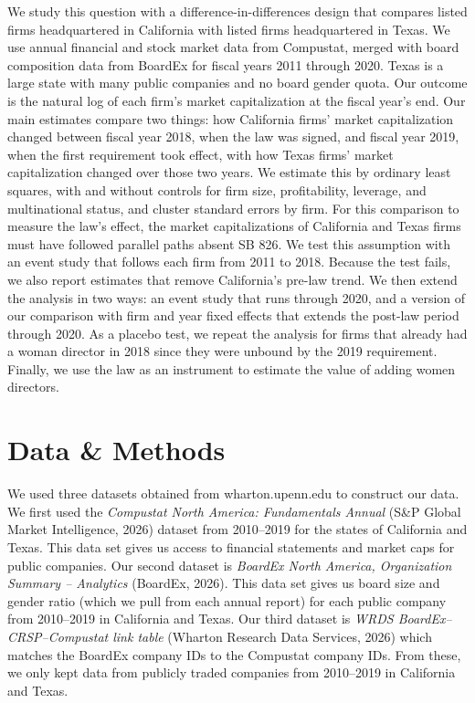 \documentclass[12pt]{article}
\begin{document}
We study this question with a difference-in-differences design that compares listed firms headquartered in California with listed firms headquartered in Texas. We use annual financial and stock market data from Compustat, merged with board composition data from BoardEx for fiscal years 2011 through 2020. Texas is a large state with many public companies and no board gender quota. Our outcome is the natural log of each firm's market capitalization at the fiscal year's end. Our main estimates compare two things: how California firms' market capitalization changed between fiscal year 2018, when the law was signed, and fiscal year 2019, when the first requirement took effect, with how Texas firms' market capitalization changed over those two years. We estimate this by ordinary least squares, with and without controls for firm size, profitability, leverage, and multinational status, and cluster standard errors by firm. For this comparison to measure the law's effect, the market capitalizations of California and Texas firms must have followed parallel paths absent SB 826. We test this assumption with an event study that follows each firm from 2011 to 2018. Because the test fails, we also report estimates that remove California's pre-law trend. We then extend the analysis in two ways: an event study that runs through 2020, and a version of our comparison with firm and year fixed effects that extends the post-law period through 2020. As a placebo test, we repeat the analysis for firms that already had a woman director in 2018 since they were unbound by the 2019 requirement. Finally, we use the law as an instrument to estimate the value of adding women directors.


\section{Data \& Methods}

We used three datasets obtained from wharton.upenn.edu to construct our data. We first used the \textit{Compustat North America: Fundamentals Annual} (S\&P Global Market Intelligence, 2026) dataset from 2010--2019 for the states of California and Texas. This data set gives us access to financial statements and market caps for public companies. Our second dataset is \textit{BoardEx North America, Organization Summary -- Analytics} (BoardEx, 2026). This data set gives us board size and gender ratio (which we pull from each annual report) for each public company from 2010--2019 in California and Texas. Our third dataset is \textit{WRDS BoardEx--CRSP--Compustat link table} (Wharton Research Data Services, 2026) which matches the BoardEx company IDs to the Compustat company IDs. From these, we only kept data from publicly traded companies from 2010--2019 in California and Texas.
\end{document}
